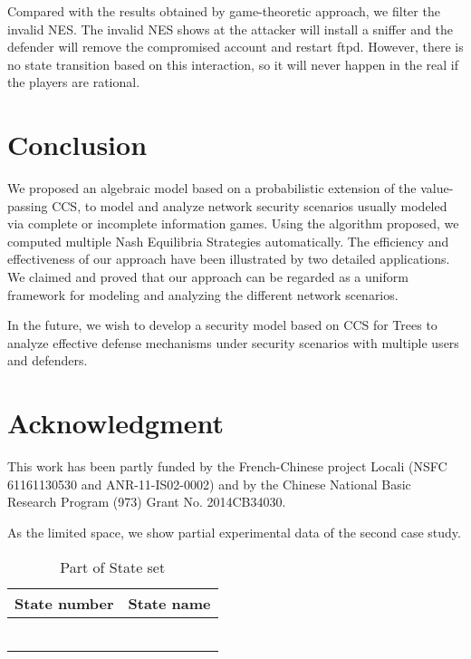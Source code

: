 \documentclass[10pt, conference, compsocconf]{IEEEtran}
\begin{document}
Compared with the results obtained by game-theoretic approach\cite{klye}, we filter the invalid NES.
The invalid NES shows at  the attacker will install a sniffer and the defender will remove the compromised account and restart ftpd.
However, there is no state transition based on this interaction, so it will never happen in the real if the players are rational.


\section{Conclusion}
We proposed an algebraic model based on a probabilistic extension of the  value-passing CCS, to model and analyze network security scenarios usually modeled via complete or incomplete information games.
Using the algorithm proposed, we computed multiple Nash Equilibria Strategies automatically.
The efficiency and effectiveness of our approach have been illustrated by two detailed applications.
We claimed and proved that our approach can be regarded as a uniform framework for modeling and analyzing the different network scenarios.

In the future, we wish to develop a security model based on CCS for Trees \cite{thomas} to analyze effective defense mechanisms under security scenarios with multiple users and defenders.
\section*{Acknowledgment}
This work has been partly funded by the French-Chinese project Locali (NSFC 61161130530 and ANR-11-IS02-0002) and by the Chinese National Basic Research Program (973) Grant No. 2014CB34030.







\appendix

As the limited space, we show partial experimental data of the second case study.
\begin{table}[h]
\scriptsize
\centering
\caption{\label{state}Part of State set}
\newcommand{\Rown}{\stepcounter{Rownumber}\theRownumber}
\begin{tabular}{cc}\hline
State number & State name\\\hline
\Rown        & \\
\Rown        & \\
\Rown        & \\
\Rown        & \\
\Rown        & \\
\Rown        & \\
\hline
\end{tabular}
\end{table}
\end{document}
